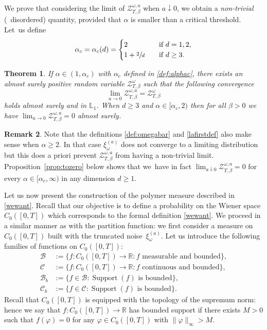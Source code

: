 \documentclass[10pt]{amsart}
\let\mathcal\mathscr
\let\sep:
\let\ra\rightarrow
\newtheorem{theorem}{Theorem}[section]
\theoremstyle{definition}
\newtheorem{rem}[theorem]{Remark}
\newcommand{\cB}{{\ensuremath{\mathcal B}} }
\newcommand{\cC}{{\ensuremath{\mathcal C}} }
\newcommand{\cZ}{{\ensuremath{\mathcal Z}} }
\DeclareMathOperator*{\supp}{\mathrm{Support}}
\newcommand{\bbL}{{\ensuremath{\mathbb L}} }
\newcommand{\bbR}{{\ensuremath{\mathbb R}} }
\let\go\omega
\begin{document}
We prove that considering the limit of $\cZ^{\go,a}_{T,\beta}$ when $a\downarrow0$, we obtain a \emph{non-trivial} (\ie \ disordered) quantity, provided that $\alpha$ is smaller than a critical threshold.
Let~us define
\begin{equation}
\label{def:alphac}
\alpha_c=\alpha_c(d) =
\begin{cases}
2 & \quad \text{if } d=1,2,\\
1+ \sfrac{2}{d}& \quad \text{if } d\ge 3.
\end{cases}
\end{equation}

\begin{theorem}
\label{thm:continuous}
If $\alpha\in (1,\alpha_c)$ with $\alpha_c$ defined in \eqref{def:alphac},
there exists an almost surely positive random variable $\cZ^{\go }_{T, \beta}$
such that the following convergence
\begin{equation*}
\lim_{a \to 0}\cZ^{\go,a }_{T, \beta}=\cZ^{\go }_{T, \beta}
\end{equation*}
holds almost surely and in $\bbL_1$.
When $d\ge 3$ and $\alpha\in [\alpha_c,2)$ then for all $\beta>0$ we have
$\lim_{a \to 0}\cZ^{\go,a }_{T, \beta}=0$ almost surely.
\end{theorem}

\begin{rem}
Note that the definitions \eqref{def:omegabar} and \eqref{lafirstdef} also make sense when $\alpha\ge 2$. In that case $\xi^{(a)}_{\go}$ does not converge to a limiting distribution but this does a priori prevent $\cZ^{\go,a}_{T,\beta}$ from having a non-trivial limit.
Proposition~\ref{prop:tozero} below shows that we~have in fact $\lim_{a\downarrow 0}\cZ^{\go,a }_{T, \beta} = 0$ for every $\alpha\in [\alpha_c,\infty)$ in any dimension $d\ge 1$.
\end{rem}

Let us now present the construction of the polymer measure described in \eqref{wewant}.
Recall that our objective is to define a probability on
the Wiener space $C_0([0,T])$
which corresponds to the formal definition \eqref{wewant}.
We proceed in a similar manner as with the partition function: we first consider a measure on $C_0([0,T])$ built with the truncated noise~$\xi_{\go}^{(a)}$.
Let us introduce the following families of functions on $C_0([0,T])$:%
\begin{equation}\label{thespaces}
\begin{split}
\cB&:=\{ f\colon C_0([0,T]) \ra \bbR \sep f \text{ measurable and bounded}\},\\
\cC&:=\{ f \colon C_0([0,T]) \ra \bbR \sep f \text{ continuous and bounded}\},\\
\cB_b&:=\{ f\in \cB \sep \supp(f) \text{ is bounded}\},\\
\cC_b&:=\{ f\in \cC \sep \supp(f) \text{ is bounded}\}.
\end{split}
\end{equation}
Recall that $C_0([0,T])$ is equipped with the topology of the supremum norm: hence we say that $f\colon C_0([0,T]) \to \bbR$ has bounded support if there exists $M>0$ such that $f(\varphi) =0$ for any $\varphi \in C_0([0,T])$ with $\|\varphi\|_{\infty} >M$.
\end{document}
